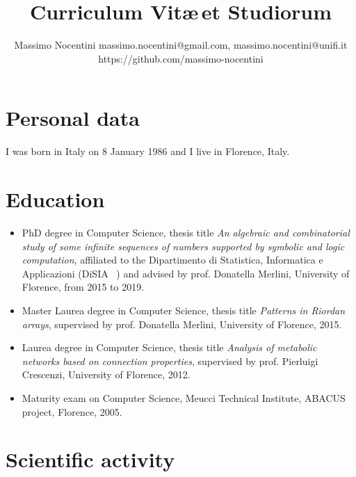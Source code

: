 \documentclass[a4paper]{tufte-handout}
\begin{document}
    \title{Curriculum Vit\ae\,et Studiorum}

    \author{Massimo Nocentini\newline
        \small{{massimo.nocentini@gmail.com}},
        \small{{massimo.nocentini@unifi.it}}\newline
        \small{{https://github.com/massimo-nocentini}}
    }

    \maketitle

    \section{Personal data}
    
    I was born in Italy on 8 January 1986 and I live in Florence, Italy. 

    \section{Education}

    \begin{itemize}
        \item PhD degree in Computer Science, thesis title \emph{An algebraic
        and combinatorial study of some infinite sequences of numbers supported
        by symbolic and logic computation}, affiliated to the Dipartimento di
        Statistica, Informatica e Applicazioni (DiSIA~
        ) and advised by prof.
        Donatella Merlini, University of Florence, from 2015 to 2019.
        \item Master Laurea degree in Computer Science, thesis title \emph{Patterns in Riordan arrays}, 
            supervised by prof. Donatella Merlini, University of Florence, 2015.
        \item Laurea degree in Computer Science, thesis title \emph{Analysis of metabolic networks based on connection properties}, 
            supervised by prof. Pierluigi Crescenzi, University of Florence, 2012.
        \item Maturity exam on Computer Science, Meucci Technical Institute, ABACUS project, Florence, 2005.
    \end{itemize}

    \section{Scientific activity}
    
\end{document}
